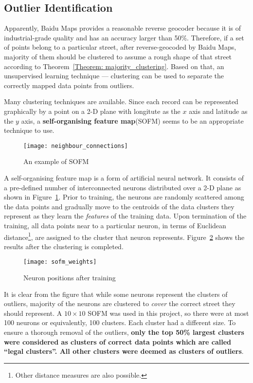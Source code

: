 \subsection{Outlier Identification}
Apparently, Baidu Maps provides a reasonable reverse geocoder because it is of industrial-grade quality and has an accuracy larger than 50\%. Therefore, if a set of points belong to a particular street, after reverse-geocoded by Baidu Maps, majority of them should be clustered to assume a rough shape of that street according to Theorem~\ref{Theorem: majority_clustering}. Based on that, an unsupervised learning technique --- clustering can be used to separate the correctly mapped data points from outliers. 

Many clustering techniques are available\cite{LO05}. Since each record can be represented graphically by a point on a 2-D plane with longitute as the $x$ axis and latitude as the $y$ axis, a \textbf{self-organising feature map}\cite{TK82}(SOFM) seems to be an appropriate technique to use. 

\begin{figure}[h]
\texttt{[image: neighbour\_connections]}
\centering
\caption{An example of SOFM}\label{Fig:neighbour_connections}
\end{figure}

A self-organising feature map is a form of artificial neural network. It consists of a pre-defined number of interconnected neurons distributed over a 2-D plane as shown in Figure~\ref{Fig:neighbour_connections}. Prior to training, the neurons are randomly scattered among the data points and gradually move to the centroids of the data clusters they represent as they learn the \emph{features} of the training data. Upon termination of the training, all data points near to a particular neuron, in terms of Euclidean distance\footnote{Other distance measures are also possible.}, are assigned to the cluster that neuron represents. Figure~\ref{Fig:sofm_weights} shows the results after the clustering is completed. 

\begin{figure}[h]
\texttt{[image: sofm\_weights]}
\centering
\caption{Neuron positions after training}\label{Fig:sofm_weights}
\end{figure}

It is clear from the figure that while some neurons represent the clusters of outliers, majority of the neurons are clustered to \emph{cover} the correct street they should represent. A $10\times10$ SOFM was used in this project, so there were at most 100 neurons or equivalently, 100 clusters. Each cluster had a different size. To ensure a thorough removal of the outliers, \textbf{only the top 50\% largest clusters were considered as clusters of correct data points which are called ``legal clusters''. All other clusters were deemed as clusters of outliers}. 

